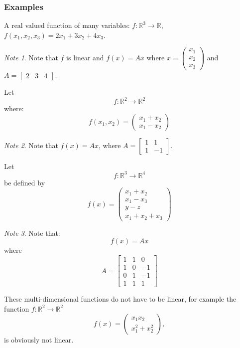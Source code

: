 \documentclass[12pt,a4paper]{article}
\theoremstyle{regla}
\theoremstyle{remark}
\newtheorem{notes}{Note}[section]
\theoremstyle{definition}
\theoremstyle{nonumberbreak}
\begin{document}
\subsubsection{Examples}
\begin{xmpl}
A real valued function of many variables: $f: \mathbb{R}^3\to\mathbb{R}$, $f(x_1,x_2,x_3)=2x_1+3x_2+4x_3$. 
\begin{notes}
Note that $f$ is linear and $f(x)=Ax$ where
$x=\begin{pmatrix} x_1\\x_2\\x_3\end{pmatrix}$ and $A=\begin{bmatrix}2&3&4\end{bmatrix}$.
\end{notes}
\end{xmpl}
\begin{xmpl}
Let 
$$
f: \mathbb{R}^{2} \rightarrow \mathbb{R}^{2}
$$
where:
$$
f(x_1,x_2) = \left(
\begin{array}{c}
x_1+x_2 \\
x_1-x_2
\end{array} \right)
$$
\begin{notes}
Note that $f(x)=Ax$, where $A=\begin{bmatrix}1&1\\1&-1\end{bmatrix}$.
\end{notes}
\end{xmpl}
\begin{xmpl}
Let 
$$
f: \mathbb{R}^{3} \rightarrow \mathbb{R}^{4}
$$
be defined by
$$
f(x)
= \left(
\begin{array}{c}
x_1+x_2 \\
x_1-x_3 \\
y-z \\
x_1+x_2+x_3
\end{array} \right)
$$
\begin{notes}
Note that:
$$
f(x) = Ax
$$
where
$$
A =
\begin{bmatrix}
1 & 1 & 0\\
1 & 0 & -1\\
0 & 1 & -1\\
1 & 1 & 1
\end{bmatrix}
$$
\end{notes}
\end{xmpl}
\begin{xmpl}
These multi-dimensional functions do not have to be linear, for example the function $f:\mathbb{R}^2\to\mathbb{R}^2$
$$
f(x) = \left(
\begin{array}{c}
x_1x_2 \\
x_1^{2}+x_2^{2}
\end{array} \right),
$$ 
is obviously not linear.
\end{xmpl}
\end{document}
